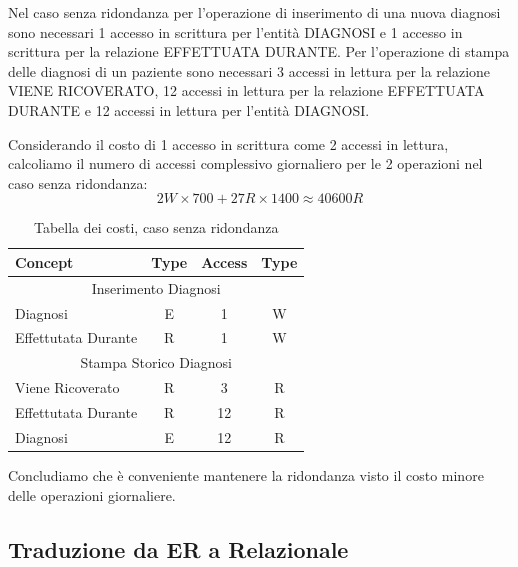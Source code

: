 \documentclass{article}
\begin{document}
Nel caso senza ridondanza per l'operazione di inserimento di una nuova diagnosi sono necessari 1 accesso in scrittura per l'entità DIAGNOSI e 1 accesso in scrittura per la relazione EFFETTUATA DURANTE.
Per l'operazione di stampa delle diagnosi di un paziente sono necessari 3 accessi in lettura per la relazione VIENE RICOVERATO, 12 accessi in lettura per la relazione EFFETTUATA DURANTE e 12 accessi in lettura per l'entità DIAGNOSI.

Considerando il costo di 1 accesso in scrittura come 2 accessi in lettura, calcoliamo il numero di accessi complessivo giornaliero per le 2 operazioni nel caso senza ridondanza:
\begin{equation}
  2W \times 700 + 27R \times 1400 \approx	40600R
\end{equation}

\begin{table}[H]
	\label{table:4}
	\centering
	\begin{tabular}{|l|c|c|c|}
		\hline
		\textbf{Concept}    & \textbf{Type} & \textbf{Access} & \textbf{Type} \\ \hline
		\multicolumn{4}{|c|}{Inserimento Diagnosi}                            \\ \hline
		Diagnosi            & E             & 1               & W             \\ \hline
		Effettutata Durante & R             & 1               & W             \\ \hline
		\multicolumn{4}{|c|}{Stampa Storico Diagnosi}                         \\ \hline
		Viene Ricoverato    & R             & 3               & R             \\ \hline
		Effettutata Durante & R             & 12              & R             \\ \hline
		Diagnosi            & E             & 12              & R             \\ \hline
  \end{tabular}
  \caption{Tabella dei costi, caso senza ridondanza}
\end{table}

Concludiamo che è conveniente mantenere la ridondanza visto il costo minore delle operazioni giornaliere.

\subsection{Traduzione da ER a Relazionale}
\end{document}
